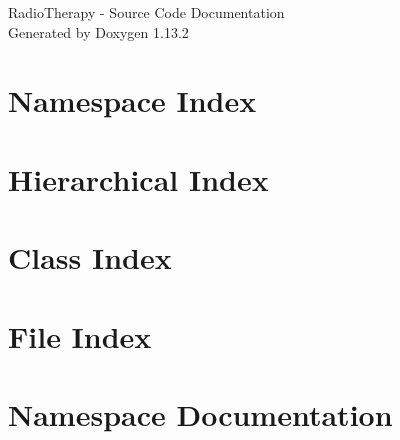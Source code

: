 \documentclass[twoside]{book}
\newcommand{\+}{\discretionary{\mbox{\scriptsize$\hookleftarrow$}}{}{}}
\newcommand{\clearemptydoublepage}{%
    \newpage{\pagestyle{empty}\cleardoublepage}%
  }
\begin{document}
  \raggedbottom
    \hypersetup{pageanchor=false,
                bookmarksnumbered=true,
                pdfencoding=unicode
               }
  \begin{titlepage}
  \vspace*{7cm}
  \begin{center}%
  {\Large Radio\+Therapy -\/ Source Code Documentation}\\
  \vspace*{1cm}
  {\large Generated by Doxygen 1.13.2}\\
  \end{center}
  \end{titlepage}
  \clearemptydoublepage
  \tableofcontents
  \clearemptydoublepage
  \hypersetup{pageanchor=true}

\chapter{Namespace Index}

\chapter{Hierarchical Index}

\chapter{Class Index}

\chapter{File Index}

\chapter{Namespace Documentation}



































\end{document}
